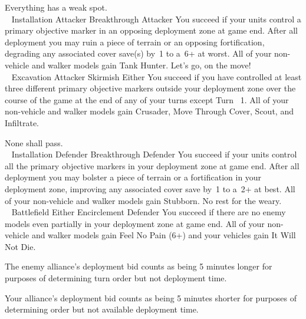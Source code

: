 \noindent%
%
{Everything has a weak spot.\\~}%
{Installation}%
{Attacker}%
{Breakthrough}%
{Attacker}%
{You succeed if your units control a primary objective marker in an
  opposing deployment zone at game end.}%
{After all deployment you may ruin a piece of terrain or an opposing
  fortification, degrading any associated cover save(s) by~1 to a~6+
  at worst.  All of your non-vehicle and walker models gain Tank
  Hunter.}
\hfill
%
{Let's go, on the move!\\~}%
{Excavation}%
{Attacker}%
{Skirmish}%
{Either}%
{You succeed if you have controlled at least three different primary
  objective markers outside your deployment zone over the course of
  the game at the end of any of your turns except Turn ~1.}%
%
{All of your non-vehicle and walker models gain Crusader, Move Through
  Cover, Scout, and Infiltrate.}

\vfill


\noindent%
%
{None shall pass.\\~}%
{Installation}%
{Defender}%
{Breakthrough}%
{Defender}%
{You succeed if your units control all the primary objective markers
  in your deployment zone at game end.}%
{After all deployment you may bolster a piece of terrain or a
  fortification in your deployment zone, improving any associated
  cover save by~1 to a~2+ at best.  All of your non-vehicle and walker
  models gain Stubborn.}
\hfill
%
{No rest for the weary.\\~}%
{Battlefield}%
{Either}%
{Encirclement}%
{Defender}%
{You succeed if there are no enemy models even partially in your
  deployment zone at game end.}%
{All of your non-vehicle and walker models gain Feel No Pain (6+) and
  your vehicles gain It Will Not Die.}


\clearpage
\restorebackground



  The enemy alliance's deployment bid counts as being 5 minutes longer
  for purposes of determining turn order but not deployment time.

  Your alliance's deployment bid counts as being 5 minutes shorter for
  purposes of determining order but not available deployment time.

